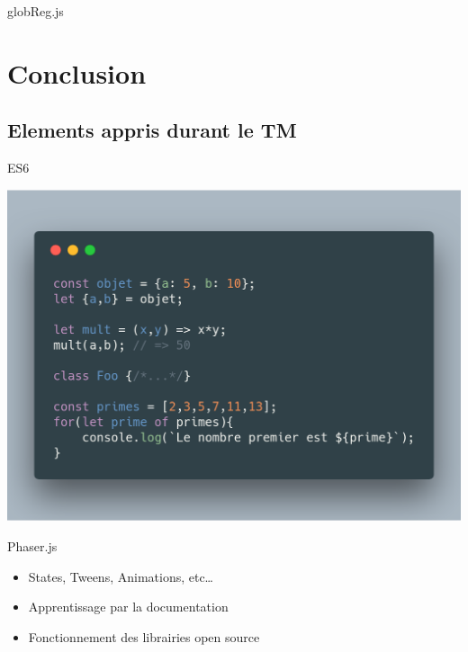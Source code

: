 \documentclass[11pt]{beamer}
\newcommand{\pauseditemize}{\pause \begin{itemize}[<+->]}
\begin{document}
\begin{frame}{globReg.js}



\end{frame}

\section{Conclusion}
\subsection{Elements appris durant le TM}

\begin{frame}{ES6}

\begin{center}
	\includegraphics[scale=.2]{../images/es6}
\end{center}

\end{frame}

\begin{frame}{Phaser.js}

\pauseditemize
	\item States, Tweens, Animations, etc\dots
	\item Apprentissage par la documentation
	\item Fonctionnement des librairies open source
\end{itemize}

\end{frame}
\end{document}
